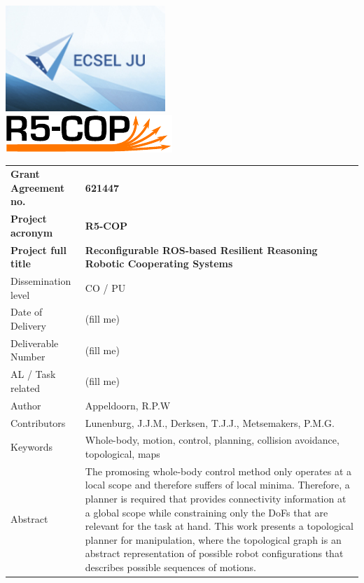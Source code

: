 \thispagestyle{empty}
{\noindent\centering\includegraphics[height=4cm]{pics/ecsel-logo}~~~~~~\\[3cm]}
{\noindent\centering\includegraphics{pics/r5-cop}\\[1cm]}

\begin{tabular}{|p{4.5cm}p{11cm}|}
\hline
\rowcolor[gray]{0.8}
\bf Grant Agreement no.
	& \bf 621447\\
\rowcolor[gray]{0.8}
\bf Project acronym
	& \bf R5-COP\\
\rowcolor[gray]{0.8}
\bf	Project full title
	& \bf Reconfigurable ROS-based Resilient Reasoning Robotic Cooperating Systems\\
\hline

Dissemination level
	& CO / PU\\
Date of Delivery
	& (fill me)\\
Deliverable Number
	& (fill me)\\
AL / Task related
	& (fill me)\\
Author
	& Appeldoorn, R.P.W\\
Contributors
	& Lunenburg, J.J.M., Derksen, T.J.J., Metsemakers, P.M.G.\\
Keywords
	& Whole-body, motion, control, planning, collision avoidance, topological, maps\\
Abstract &
	The promosing whole-body control method only operates at a local scope and therefore suffers of local minima.
Therefore, a planner is required that provides connectivity information at a global scope while constraining only the DoFs that are relevant for the task at hand. This work presents a topological planner for manipulation, where the topological graph is an abstract representation of possible robot configurations that describes possible sequences of motions.
\hline
\end{tabular}
\vfill\eject
